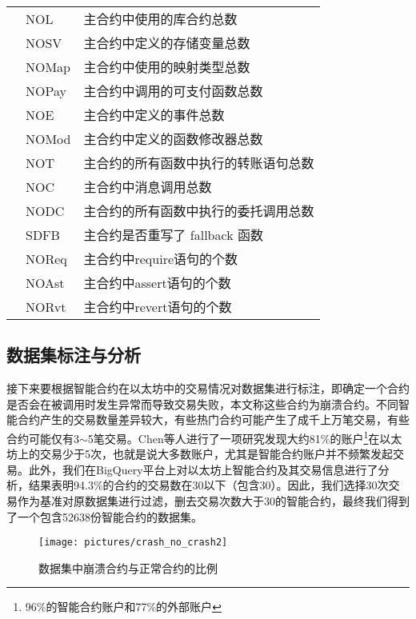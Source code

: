 \begin{table}[htbp]
\begin{tabularx}{\linewidth}{cp{3.5cm}<{\centering}X<{\raggedright}}
                                       & NOL                & 主合约中使用的库合约总数\\
                                       & NOSV                & 主合约中定义的存储变量总数 \\
                                       & NOMap              & 主合约中使用的映射类型总数 \\
                                       & NOPay               & 主合约中调用的可支付函数总数 \\
                                       & NOE                 & 主合约中定义的事件总数 \\
                                       & NOMod               &  主合约中定义的函数修改器总数 \\
                                       & NOT                 & 主合约的所有函数中执行的转账语句总数 \\
                                       & NOC                 & 主合约中消息调用总数 \\
                                       & NODC                & 主合约的所有函数中执行的委托调用总数 \\
                                       & SDFB                & 主合约是否重写了 fallback 函数 \\ 
                                       & NOReq         & 主合约中require语句的个数 \\
                                       & NOAst         & 主合约中assert语句的个数 \\
                                       & NORvt         & 主合约中revert语句的个数 \\ \hline
        \end{tabularx}
\end{table}
\subsection{数据集标注与分析}
接下来要根据智能合约在以太坊中的交易情况对数据集进行标注，即确定一个合约是否会在被调用时发生异常而导致交易失败，本文称这些合约为崩溃合约。不同智能合约产生的交易数量差异较大，有些热门合约可能产生了成千上万笔交易，有些合约可能仅有3$\sim$5笔交易。Chen等人进行了一项研究\cite{chen2020understand}发现大约81\%的账户\footnote{96\%的智能合约账户和77\%的外部账户}在以太坊上的交易少于5次，也就是说大多数账户，尤其是智能合约账户并不频繁发起交易。此外，我们在BigQuery平台上对以太坊上智能合约及其交易信息进行了分析，结果表明94.3\%的合约的交易数在30以下（包含30）。因此，我们选择30次交易作为基准对原数据集进行过滤，删去交易次数大于30的智能合约，最终我们得到了一个包含\num{52638}份智能合约的数据集。
\begin{figure}[htbp]
    \centering
    \texttt{[image: pictures/crash\_no\_crash2]}
    \caption{\label{fig:crash_no_crash2}数据集中崩溃合约与正常合约的比例}
\end{figure}

